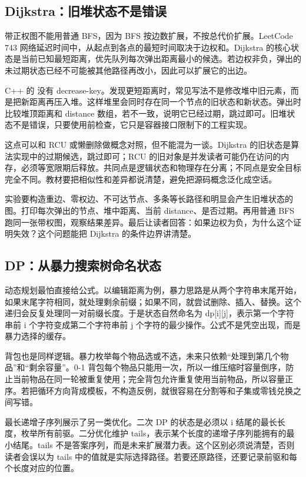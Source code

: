 \subsection{Dijkstra：旧堆状态不是错误}

带正权图不能用普通 BFS，因为 BFS 按边数扩展，不按总代价扩展。LeetCode 743 网络延迟时间中，从起点到各点的最短时间取决于边权和。Dijkstra 的核心状态是当前已知最短距离，优先队列每次弹出距离最小的候选。若边权非负，弹出的未过期状态已经不可能被其他路径再改小，因此可以扩展它的出边。

C++ 的  没有 decrease-key。发现更短距离时，常见写法不是修改堆中旧元素，而是把新距离再压入堆。这样堆里会同时存在同一个节点的旧状态和新状态。弹出时比较堆顶距离和 distance 数组，若不一致，说明它已经过期，跳过即可。旧堆状态不是错误，只要使用前检查，它只是容器接口限制下的工程实现。

这点可以和 RCU 或懒删除做概念对照，但不能混为一谈。Dijkstra 的旧状态是算法实现中的过期候选，跳过即可；RCU 的旧对象是并发读者可能仍在访问的内存，必须等宽限期后释放。共同点是逻辑状态和物理存在分离；不同点是安全目标完全不同。教材要把相似性和差异都说清楚，避免把源码概念泛化成空话。

实验要构造重边、零权边、不可达节点、多条等长路径和明显会产生旧堆状态的图。打印每次弹出的节点、堆中距离、当前 distance、是否过期。再用普通 BFS 跑同一张带权图，观察结果差异。最后让读者回答：如果边权为负，为什么这个证明失效？这个问题能把 Dijkstra 的条件边界讲清楚。

\subsection{DP：从暴力搜索树命名状态}

动态规划最怕直接给公式。以编辑距离为例，暴力思路是从两个字符串末尾开始，如果末尾字符相同，就处理剩余前缀；如果不同，就尝试删除、插入、替换。这个递归会反复处理同一对前缀长度。于是状态自然命名为 dp[i][j]，表示第一个字符串前 i 个字符变成第二个字符串前 j 个字符的最少操作。公式不是凭空出现，而是暴力选择的缓存。

背包也是同样逻辑。暴力枚举每个物品选或不选，未来只依赖“处理到第几个物品”和“剩余容量”。0-1 背包每个物品只能用一次，所以一维压缩时容量倒序，防止当前物品在同一轮被重复使用；完全背包允许重复使用当前物品，所以容量正序。若把循环方向背成模板，不构造反例，就很容易在分割等和子集或零钱兑换之间写错。

最长递增子序列展示了另一类优化。二次 DP 的状态是必须以 i 结尾的最长长度，枚举所有前驱。二分优化维护 tails，表示某个长度的递增子序列能拥有的最小结尾。tails 不是答案序列，而是未来扩展潜力表。这个区别必须说清楚，否则读者会误以为 tails 中的值就是实际选择路径。若要还原路径，还要记录前驱和每个长度对应的位置。

